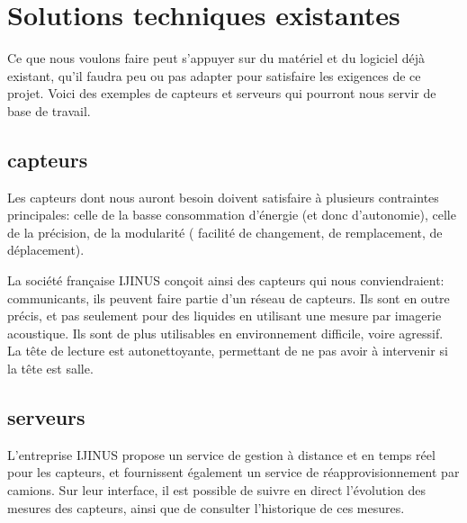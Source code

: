 \section{Solutions techniques existantes}

Ce que nous voulons faire peut s'appuyer sur du matériel et 
du logiciel déjà existant, qu'il faudra peu ou pas adapter pour
satisfaire les exigences de ce projet. Voici des exemples de
capteurs et serveurs qui pourront nous servir de base de
travail.

\subsection{capteurs}

Les capteurs dont nous auront besoin doivent satisfaire à plusieurs
contraintes principales: celle de la basse consommation d'énergie
(et donc d'autonomie), celle de la précision, de la modularité (
facilité de changement, de remplacement, de déplacement).

La société française IJINUS conçoit ainsi des capteurs qui nous
conviendraient: communicants, ils peuvent faire partie d'un
réseau de capteurs. Ils sont en outre précis, et pas seulement
pour des liquides en utilisant une mesure par imagerie acoustique.
Ils sont de plus utilisables en environnement difficile, voire agressif.
La tête de lecture est autonettoyante, permettant de ne pas avoir
à intervenir si la tête est salle.

\begin{figure}
\begin{center}


\end{center}
\end{figure}


\subsection{serveurs}

L'entreprise IJINUS propose un service de gestion à distance et en temps
réel pour les capteurs, et fournissent également un service de
réapprovisionnement par camions.
Sur leur interface, il est possible de suivre en direct l'évolution des
mesures des capteurs, ainsi que de consulter l'historique de ces mesures.
